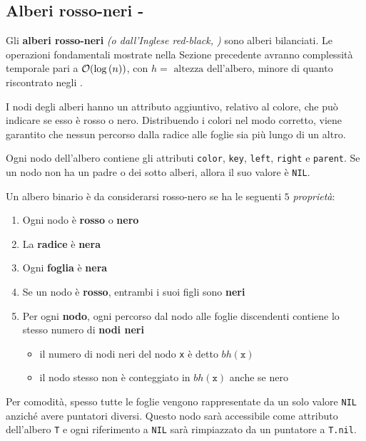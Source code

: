 \documentclass[italian, 10pt]{article}
\begin{document}
\subsection{Alberi rosso-neri - \RB}
\label{sec:alberi-rosso-neri}

Gli \textbf{alberi rosso-neri} \textit{(o dall'Inglese red-black, \RB)} sono alberi bilanciati.
Le operazioni fondamentali mostrate nella Sezione precedente avranno complessità temporale pari a \(\mathcal{O}(\log{(n)})\), con \(h = \text{ altezza dell'albero}\), minore di quanto riscontrato negli \BST.

I nodi degli alberi \RB hanno un attributo aggiuntivo, relativo al colore, che può indicare se esso è rosso o nero.
Distribuendo i colori nel modo corretto, viene garantito che nessun percorso dalla radice alle foglie sia più lungo di un altro.

Ogni nodo dell'albero contiene gli attributi \texttt{color}, \texttt{key}, \texttt{left}, \texttt{right} e \texttt{parent}.
Se un nodo non ha un padre o dei sotto alberi, allora il suo valore è \texttt{NIL}.

Un albero binario è da considerarsi rosso-nero se ha le seguenti \(5\) \textit{proprietà}:

\begin{enumerate}[label=\arabic*., ref=(\arabic*)]
  \item \label{enum:proprieta-1-nodi-rb}Ogni nodo è \textbf{rosso} o \textbf{nero}
  \item \label{enum:proprieta-2-nodi-rb}La \textbf{radice} è \textbf{nera}
  \item \label{enum:proprieta-3-nodi-rb}Ogni \textbf{foglia} è \textbf{nera}
  \item \label{enum:proprieta-4-nodi-rb}Se un nodo è \textbf{rosso}, entrambi i suoi figli sono \textbf{neri}
  \item \label{enum:proprieta-5-nodi-rb} Per ogni \textbf{nodo}, ogni percorso dal nodo alle foglie discendenti contiene lo stesso numero di \textbf{nodi neri}
        \begin{itemize}
          \item il numero di nodi neri del nodo \texttt{x} è detto \(bh(\texttt{x})\)
          \item il nodo stesso non è conteggiato in \(bh(\texttt{x})\) anche se nero
        \end{itemize}
\end{enumerate}

Per comodità, spesso tutte le foglie vengono rappresentate da un solo valore \texttt{NIL} anziché avere puntatori diversi.
Questo nodo sarà accessibile come attributo dell'albero \texttt{T} e ogni riferimento a \texttt{NIL} sarà rimpiazzato da un puntatore a \texttt{T.nil}.
\end{document}

